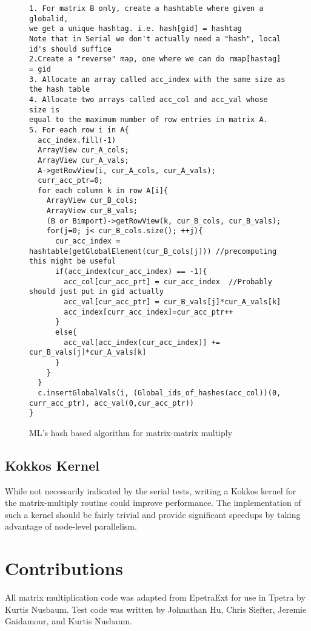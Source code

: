 \documentclass[pdf,12pt]{SANDreport}
\begin{document}
\begin{figure}
\centering
{\footnotesize
\begin{verbatim}
1. For matrix B only, create a hashtable where given a globalid, 
we get a unique hashtag. i.e. hash[gid] = hashtag
Note that in Serial we don't actually need a "hash", local id's should suffice
2.Create a "reverse" map, one where we can do rmap[hastag] = gid
3. Allocate an array called acc_index with the same size as the hash table
4. Allocate two arrays called acc_col and acc_val whose size is 
equal to the maximum number of row entries in matrix A.
5. For each row i in A{
  acc_index.fill(-1)
  ArrayView cur_A_cols;
  ArrayView cur_A_vals;
  A->getRowView(i, cur_A_cols, cur_A_vals);
  curr_acc_ptr=0;
  for each column k in row A[i]{
    ArrayView cur_B_cols;
    ArrayView cur_B_vals;
    (B or Bimport)->getRowView(k, cur_B_cols, cur_B_vals);
    for(j=0; j< cur_B_cols.size(); ++j){
      cur_acc_index = hashtable(getGlobalElement(cur_B_cols[j])) //precomputing this might be useful
      if(acc_index(cur_acc_index) == -1){
        acc_col[cur_acc_prt] = cur_acc_index  //Probably should just put in gid actually
        acc_val[cur_acc_ptr] = cur_B_vals[j]*cur_A_vals[k]
        acc_index[curr_acc_index]=cur_acc_ptr++
      }
      else{
        acc_val[acc_index(cur_acc_index)] += cur_B_vals[j]*cur_A_vals[k]
      }
    }
  }
  c.insertGlobalVals(i, (Global_ids_of_hashes(acc_col))(0, curr_acc_ptr), acc_val(0,cur_acc_ptr))
}

\end{verbatim}
}
\caption[Hash based algorithm]{ML's hash based algorithm for matrix-matrix multiply}
\label{hashalgo}
\end{figure}

\subsection{Kokkos Kernel}
While not necessarily indicated by the serial tests, writing a Kokkos kernel for the matrix-multiply routine could improve
performance. The implementation of such a kernel should be fairly trivial and provide significant speedups by taking
advantage of node-level parallelism.

\section{Contributions}
All matrix multiplication code was adapted from EpetraExt for use in Tpetra by Kurtis Nusbaum. Test code was written by 
Johnathan Hu, Chris Siefter, Jeremie Gaidamour, and Kurtis Nusbaum.
\end{document}
